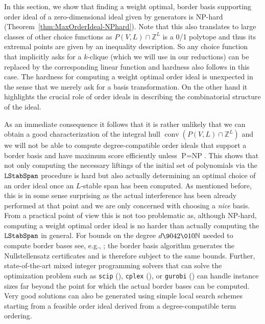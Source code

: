 \documentclass[11pt,oneside,english]{amsart}
\makeatletter
\numberwithin{equation}{section}
\numberwithin{figure}{section}
\theoremstyle{plain}
\theoremstyle{definition}
\theoremstyle{definition}
\theoremstyle{remark}
\theoremstyle{plain}
\theoremstyle{plain}
\theoremstyle{plain}
\theoremstyle{problem@}
\newcounter{problem}
\makeatother
\begin{document}
In this section,
we show that finding a weight optimal, border basis supporting order ideal of
a zero-dimensional ideal given by generators is {\textrm{NP}\xspace}-hard
(Theorem~\ref{thm:MaxOrderIdeal-NPhard}).
Note that this also translates to large
classes of other choice functions as $P(V,L) \cap {\mathbb{Z}}^L$ is a 0/1 polytope and
thus its extremal points are given by an inequality description. So any choice
function that implicitly asks for a $k$-clique (which we will use in our reductions) can be replaced by the
corresponding linear function and hardness also follows in this case.
The hardness for computing a weight optimal order ideal is
unexpected in the sense that we merely ask for a basis transformation. On the
other hand it highlights the crucial role of order ideals in describing the
combinatorial structure of the ideal.

As an immediate consequence it follows that it is rather unlikely that we can
obtain a good characterization of the integral hull ${\operatorname{conv}({P(V,L) \cap {\mathbb{Z}}^L})}$
and we will not be able to compute degree-compatible order ideals that support
a border basis and have maximum score efficiently unless ${\textrm{P}\xspace}={\textrm{NP}\xspace} $. This shows
that not only computing the necessary liftings of the initial set of
polynomials via the ${\ensuremath{\operatorname{{\textnormal{\texttt{{LStabSpan}}}}}}}$ procedure is hard but also actually
determining an optimal choice of an order ideal once an $L$-stable span has
been computed. As mentioned before, this is in some sense surprising as the actual interference has
been already performed at that point and we are only concerned with choosing a
\emph{nice} basis. From a practical point of view this is not too problematic
as, although {\textrm{NP}\xspace}-hard, computing a weight optimal order ideal is no harder
than actually computing the ${\ensuremath{\operatorname{{\textnormal{\texttt{{LStabSpan}}}}}}}$ in general. For bounds on the degree
$d {\9042\010} {\mathbb{N}}$ needed to compute border bases see, e.g., \cite[Lemma
2.4]{deLoera2009ecps}; the border basis algorithm generates the
Nullstellensatz certificates and is therefore subject to the same
bounds. Further, state-of-the-art mixed integer programming solvers that can
solve the optimization problem such as {\textnormal{\texttt{{scip}}}}
(\cite{achterberg2009scip}), {\textnormal{\texttt{{cplex}}}} (\cite{cplex200811}), or
{\textnormal{\texttt{{gurobi}}}} (\cite{gurobi}) can handle instance sizes far beyond the
point for which the actual border bases can be computed. Very good solutions
can also be generated using simple local search schemes starting from a
feasible order ideal derived from a degree-compatible term ordering.
\end{document}

